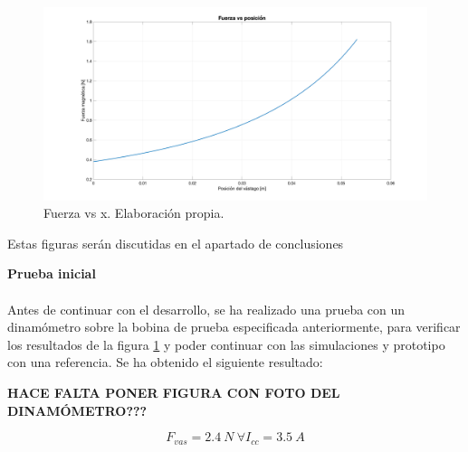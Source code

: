 \begin{figure}[H]
    \centering
    \includegraphics[width=\linewidth]{FigurasMemoria/calcFsetupBase.png}
    \caption{Fuerza vs x. Elaboración propia.}
    \label{fig:calcFsetupBase} %
\end{figure}

Estas figuras serán discutidas en el apartado de conclusiones %

\noindent \textbf{Prueba inicial}
\\~\\
\indent Antes de continuar con el desarrollo, se ha realizado una prueba con un dinamómetro sobre la bobina de prueba especificada anteriormente, para verificar los resultados de la figura \ref{fig:calcFsetupBase} y poder continuar con las simulaciones y prototipo con una referencia. Se ha obtenido el siguiente resultado:

\textbf{HACE FALTA PONER FIGURA CON FOTO DEL DINAMÓMETRO???}

\[F_{vas}=2.4~N~\forall I_{cc}=3.5~A\]